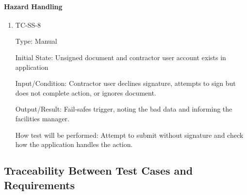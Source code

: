 \documentclass[12pt, titlepage]{article}
\begin{document}
\paragraph{Hazard Handling}

\begin{enumerate}

  \item{TC-SS-8\\}

    Type: Manual

    Initial State: Unsigned document and contractor user account
    exists in application

    Input/Condition: Contractor user declines signature, attempts to
    sign but does not complete action, or ignores document.

    Output/Result: Fail-safes trigger, noting the bad data and
    informing the facilities manager.

    How test will be performed: Attempt to submit without signature
    and check how the application handles the action.

\end{enumerate}

\subsection{Traceability Between Test Cases and Requirements}

\end{document}
